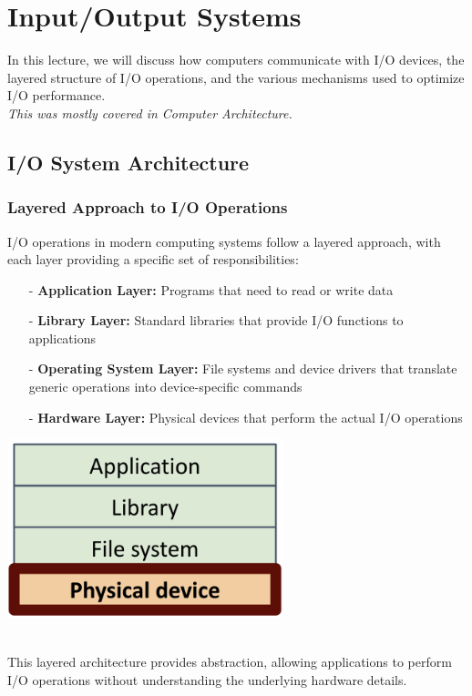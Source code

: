 \documentclass[../../compsys.tex]{subfiles}
\begin{document}
\chapter{Input/Output Systems}
In this lecture, we will discuss how computers communicate with I/O devices, the layered structure of I/O operations, and the various mechanisms used to optimize I/O performance. \\
\textit{This was mostly covered in Computer Architecture.}

\section{I/O System Architecture}

\subsection{Layered Approach to I/O Operations}
I/O operations in modern computing systems follow a layered approach, with each layer providing a specific set of responsibilities: \\[5px]
\noindent 
\begin{minipage}{0.45\textwidth}
\begin{itemize}
    \item[-] \textbf{Application Layer:} Programs that need to read or write data
    \item[-] \textbf{Library Layer:} Standard libraries that provide I/O functions to applications
    \item[-] \textbf{Operating System Layer:} File systems and device drivers that translate generic operations into device-specific commands
    \item[-] \textbf{Hardware Layer:} Physical devices that perform the actual I/O operations
\end{itemize}
\end{minipage}
\hfill
\vline
\hfill
\begin{minipage}{0.45\textwidth}
\begin{center}
  \includegraphics[width=0.6\textwidth]{chapters/L8/images/layers.png}
\end{center}
\end{minipage}\\[7px]
This layered architecture provides abstraction, allowing applications to perform I/O operations without understanding the underlying hardware details.
\end{document}
